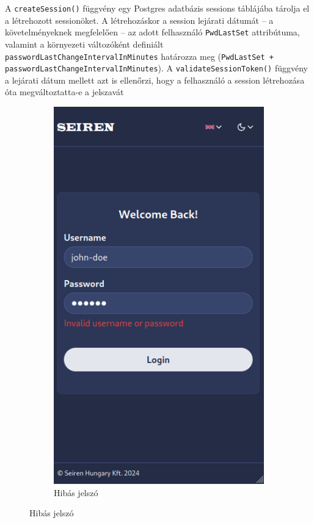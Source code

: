 \documentclass[a4paper]{article}
\newcommand{\inlts}[1]{\texttt{#1}}
\begin{document}
A \inlts{createSession()} függvény egy Postgres adatbázis sessions táblájába tárolja el a
létrehozott sessionöket. A létrehozáskor a session lejárati dátumát – a követelményeknek
megfelelően – az adott felhasználó \inlts{PwdLastSet} attribútuma, valamint a környezeti változóként
definiált \inlts{passwordLastChangeIntervalInMinutes} határozza meg
(\inlts{PwdLastSet + passwordLastChangeIntervalInMinutes}). A \inlts{validateSessionToken()} függvény a lejárati dátum mellett
azt is ellenőrzi, hogy a felhasználó a session létrehozása óta megváltoztatta-e a
jelszavát

\begin{figure}[ht]
    \centering
    \begin{subfigure}[b]{0.45\textwidth}
        \centering
        \includegraphics[clip, trim=0 30 0 0, height=0.4\textheight]{images/login_wrong_passwd.png}
        \caption{Hibás jelszó}
        \label{fig:login_wrong_passwd}
    \end{subfigure}

\end{figure}
\end{document}
